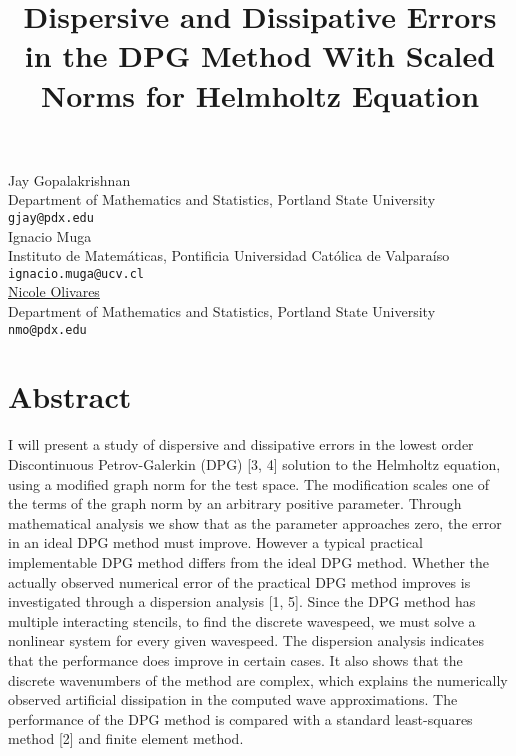\documentclass[article,A4,11pt]{llncs}%
\begin{document}
\title{Dispersive and Dissipative Errors in the DPG Method With Scaled Norms for Helmholtz Equation}
 \author{} \institute{}
\maketitle
\begin{center}
{\large Jay Gopalakrishnan}\\
Department of Mathematics and Statistics, Portland State University\\
{\tt gjay@pdx.edu}
\\ \vspace{4mm}
{\large Ignacio Muga}\\
Instituto de Matemáticas, Pontificia Universidad Católica de Valparaíso\\
{\tt ignacio.muga@ucv.cl}
\\ \vspace{4mm}
{\large \underline{Nicole Olivares}}\\
Department of Mathematics and Statistics, Portland State University\\
{\tt nmo@pdx.edu}
\end{center}

\section*{Abstract}
I will present a study of dispersive and dissipative errors in the lowest order Discontinuous Petrov-Galerkin (DPG) [3, 4] solution to the Helmholtz equation, using a modified graph norm for the test space. The modification scales one of the terms of the graph norm by an arbitrary positive parameter. Through mathematical analysis we show that as the parameter approaches zero, the error in an ideal DPG method must improve. However a typical practical implementable DPG method differs from the ideal DPG method. Whether the actually observed numerical error of the practical DPG method improves is investigated through a dispersion analysis [1, 5]. Since the DPG method has multiple interacting stencils, to find the discrete wavespeed, we must solve a nonlinear system for every given wavespeed. The dispersion analysis indicates that the performance does improve in certain cases. It also shows that the discrete wavenumbers of the method are complex, which explains the numerically observed artificial dissipation in the computed wave approximations. The performance of the DPG method is compared with a standard least-squares method [2] and finite element method.
\end{document}
